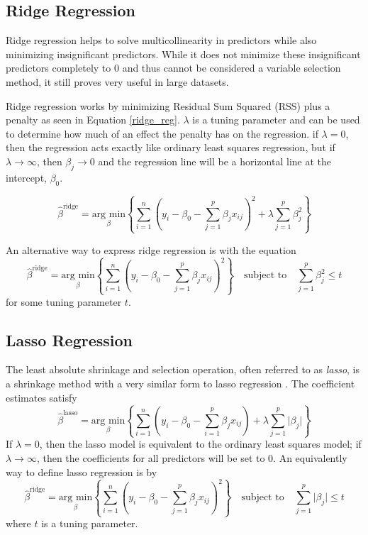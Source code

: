 \documentclass{article}
\newcommand{\argmin}[1]{\underset{\beta}{\text{arg min}}}
\begin{document}
\subsection{Ridge Regression}
Ridge regression helps to solve multicollinearity in predictors while also minimizing insignificant predictors. While it does not minimize these insignificant predictors completely to 0 and thus cannot be considered a variable selection method, it still proves very useful in large datasets.

Ridge regression works by minimizing Residual Sum Squared (RSS) plus a penalty as seen in Equation \ref{ridge_reg}. $\lambda$ is a tuning parameter and can be used to determine how much of an effect the penalty has on the regression. if $\lambda=0$, then the regression acts exactly like ordinary least squares regression, but if $\lambda \rightarrow \infty$, then $\beta_j \rightarrow 0$ and the regression line will be a horizontal line at the intercept, $\beta_0$.

\begin{equation}
	\hat{\beta}^{\text{ridge}} = \argmin{\beta}\left\{ \sum_{i=1}^{n} \left( y_i - \beta_0 - \sum_{j=1}^{p} \beta_jx_{ij} \right)^2 + \lambda \sum_{j=1}^{p} \beta_j^2  \right\}
	\label{ridge_reg}
\end{equation}

An alternative way to express ridge regression is with the equation
\begin{equation}
	\hat{\beta}^{\text{ridge}} = \argmin{\beta}\left\{ \sum_{i=1}^{n} \left( y_i - \beta_0 - \sum_{j=1}^{p} \beta_jx_{ij} \right)^2\right\}\quad\text{subject to}\quad \sum_{j=1}^{p} \beta_j^2\leq t
\end{equation}
for some tuning parameter $t$.

\subsection{Lasso Regression}

The least absolute shrinkage and selection operation, often referred to as \textit{lasso}, is a shrinkage method with a very similar form to lasso regression \cite{tibshirani1996regression, james2017islr, james2013introduction}. The coefficient estimates satisfy
\begin{equation}
	\hat{\beta}^{\text{lasso}}=\argmin{\beta}\left\{ \sum\limits_{i = 1}^n \left( y_i - \beta_0 - \sum\limits_{i = 1}^p \beta_j x_{ij} \right) + \lambda\sum\limits_{j = 1}^p \vert \beta_j \vert \right\}
\end{equation}
If $\lambda = 0$, then the lasso model is equivalent to the ordinary least squares model; if $\lambda \to \infty$, then the coefficients for all predictors will be set to 0. An equivalently way to define lasso regression is by
\begin{equation}
	\hat{\beta}^{\text{ridge}} = \argmin{\beta}\left\{ \sum_{i=1}^{n} \left( y_i - \beta_0 - \sum_{j=1}^{p} \beta_jx_{ij} \right)^2 \right\}\quad\text{subject to}\quad \sum_{j=1}^{p} \vert \beta_j \vert\leq t
\end{equation}
where $t$ is a tuning parameter.
\end{document}
